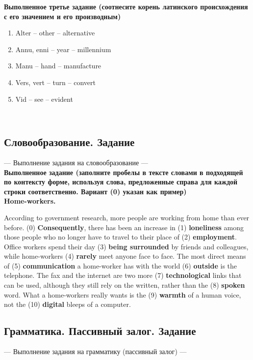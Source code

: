 \documentclass[main.tex]{subfiles}
\begin{document}
\textbf{Выполненное третье задание (соотнесите корень латинского происхождения с его значением и его производным)}

\begin{enumerate}[nosep]
	\item Alter -- other -- alternative
	\item Annu, enni -- year -- millennium
	\item Manu -- hand -- manufacture
	\item Vers, vert -- turn -- convert
	\item Vid -- see -- evident
\end{enumerate}
\ 

\subsection{Словообразование. Задание}

--- Выполнение задания на словообразование ---
\\

\textbf{Выполненное задание (заполните пробелы в тексте словами в подходящей по контексту форме, используя слова, предложенные справа для каждой строки соответственно. Вариант (0) указан как пример)}
\\

\textbf{Home-workers.}

According to government research, more people are working from home than ever before.
(0) \textbf{Consequently}, there has been an increase in (1) \textbf{loneliness} among those people who no longer have to travel to their place of (2) \textbf{employment}.
Office workers spend their day (3) \textbf{being surrounded} by friends and colleagues, while home-workers (4) \textbf{rarely} meet anyone face to face.
The most direct means of (5) \textbf{communication} a home-worker has with the world (6) \textbf{outside} is the telephone.
The fax and the internet are two more (7) \textbf{technological} links that can be used, although they still rely on the written, rather than the (8) \textbf{spoken} word.
What a home-workers really wants is the (9) \textbf{warmth} of a human voice, not the (10) \textbf{digital} bleeps of a computer.
\\

\subsection{Грамматика. Пассивный залог. Задание}

--- Выполнение задания на грамматику (пассивный залог) ---
\\
\end{document}
